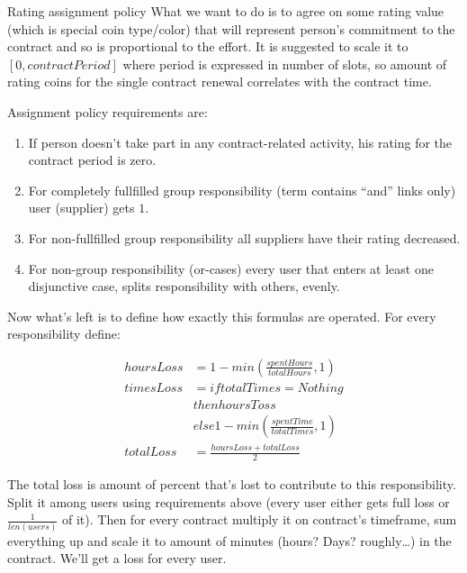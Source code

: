 \documentclass[]{itmo-student-thesis}
\begin{document}
Rating assignment policy What we want to do is to agree on some rating
value (which is special coin type/color) that will represent person’s
commitment to the contract and so is proportional to the effort. It is
suggested to scale it to $[0,contractPeriod]$ where period is expressed
in number of slots, so amount of rating coins for the single contract
renewal correlates with the contract time.

Assignment policy requirements are:

\begin{enumerate}

\item If person doesn’t take part in any contract-related activity,
  his rating for the contract period is zero.

\item For completely fullfilled group responsibility (term contains
  “and” links only) user (supplier) gets $1$.

\item For non-fullfilled group responsibility all suppliers have their
  rating decreased.

\item For non-group responsibility (or-cases) every user that enters
  at least one disjunctive case, splits responsibility with others,
  evenly.

\end{enumerate}

Now what’s left is to define how exactly this formulas are operated. For every responsibility define:

\begin{align*}
hoursLoss &= 1 - min(\frac{spentHours}{totalHours}, 1) \\
timesLoss &= if totalTimes = Nothing \\
          &  then hoursToss \\
          &  else 1 - min(\frac{spentTime}{totalTimes}, 1) \\
totalLoss &= \frac{hoursLoss + totalLoss}{2}
\end{align*}

The total loss is amount of percent that’s lost to contribute to this
responsibility. Split it among users using requirements above (every
user either gets full loss or $\frac{1}{len(users)}$ of it). Then for every
contract multiply it on contract’s timeframe, sum everything up and
scale it to amount of minutes (hours? Days? roughly…) in the
contract. We’ll get a loss for every user.
\end{document}
